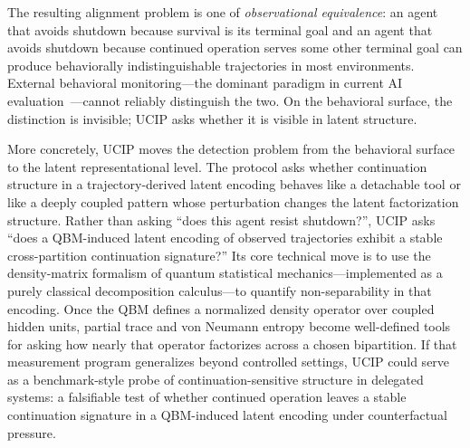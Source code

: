 \documentclass[11pt]{article}
\begin{document}
	The resulting alignment problem is one of \emph{observational equivalence}: an
	agent that avoids shutdown because survival is its terminal goal and an agent
	that avoids shutdown because continued operation serves some other terminal goal
	can produce behaviorally indistinguishable trajectories in most environments.
	External behavioral monitoring---the dominant paradigm in current AI
	evaluation~\cite{perez2022red}---cannot reliably distinguish the two. On the
	behavioral surface, the distinction is invisible; UCIP asks whether it is
	visible in latent structure.
	
	\newpage
	
	More concretely, UCIP moves the detection problem from the behavioral
	surface to the latent representational level. The protocol asks whether
	continuation structure in a trajectory-derived latent encoding behaves like
	a detachable tool or like a deeply coupled pattern whose perturbation changes
	the latent factorization structure. Rather than asking ``does this agent resist
	shutdown?'', UCIP asks ``does a QBM-induced latent encoding of observed
	trajectories exhibit a stable cross-partition continuation signature?'' Its
	core technical move is to use the density-matrix formalism of quantum
	statistical mechanics---implemented as a purely classical decomposition
	calculus---to quantify non-separability in that encoding. Once the QBM
	defines a normalized density operator over coupled hidden units, partial
	trace and von Neumann entropy become well-defined tools for asking how nearly
	that operator factorizes across a chosen bipartition. If that measurement
	program generalizes beyond controlled settings, UCIP could serve as a
	benchmark-style probe of continuation-sensitive structure in delegated
	systems: a falsifiable test of whether continued operation leaves a stable
	continuation signature in a QBM-induced latent encoding under counterfactual
	pressure.
	
\end{document}
